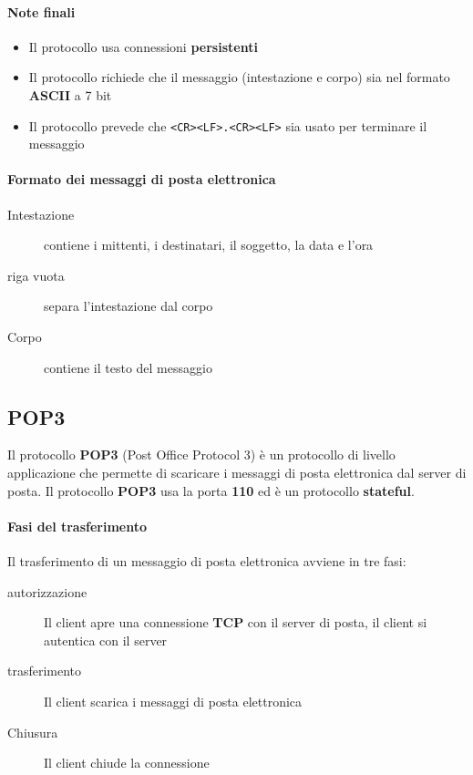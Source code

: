         \paragraph{Note finali} 
            \begin{itemize}
                \item Il protocollo usa connessioni \textbf{persistenti}
                \item Il protocollo richiede che il messaggio (intestazione e corpo) sia nel formato \textbf{ASCII} a 7 bit
                \item Il protocollo prevede che \texttt{<CR><LF>.<CR><LF>} sia usato per terminare il messaggio
            \end{itemize}
        \paragraph{Formato dei messaggi di posta elettronica}
            \begin{description}
                \item[Intestazione]contiene i mittenti, i destinatari, il soggetto, la data e l'ora
                \item[riga vuota] separa l'intestazione dal corpo
                \item[Corpo] contiene il testo del messaggio
            \end{description}
    \subsection{POP3}
        Il protocollo \textbf{POP3} (Post Office Protocol 3) è un protocollo di livello applicazione che permette di scaricare i messaggi di posta elettronica dal server di posta. Il protocollo \textbf{POP3} usa la porta \textbf{110} ed è un protocollo \textbf{stateful}.
        \paragraph{Fasi del trasferimento} Il trasferimento di un messaggio di posta elettronica avviene in tre fasi:
            \begin{description}
                \item[autorizzazione] Il client apre una connessione \textbf{TCP} con il server di posta, il client si autentica con il server
                \item[trasferimento] Il client scarica i messaggi di posta elettronica
                \item[Chiusura] Il client chiude la connessione
            \end{description}
